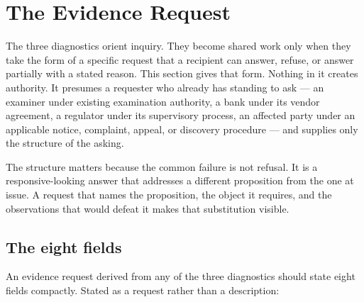 %

\section{The Evidence Request}
\label{sec:request}

The three diagnostics orient inquiry. They become shared work only when they
take the form of a specific request that a recipient can answer, refuse, or
answer partially with a stated reason. This section gives that form. Nothing in
it creates authority. It presumes a requester who already has standing to ask
--- an examiner under existing examination authority, a bank under its vendor
agreement, a regulator under its supervisory process, an affected party under
an applicable notice, complaint, appeal, or discovery procedure --- and
supplies only the structure of the asking.

The structure matters because the common failure is not refusal. It is a
responsive-looking answer that addresses a different proposition from the one
at issue. A request that names the proposition, the object it requires, and the
observations that would defeat it makes that substitution visible.

\subsection{The eight fields}
\label{sec:request:fields}

An evidence request derived from any of the three diagnostics should state
eight fields compactly. Stated as a request rather than a description:

